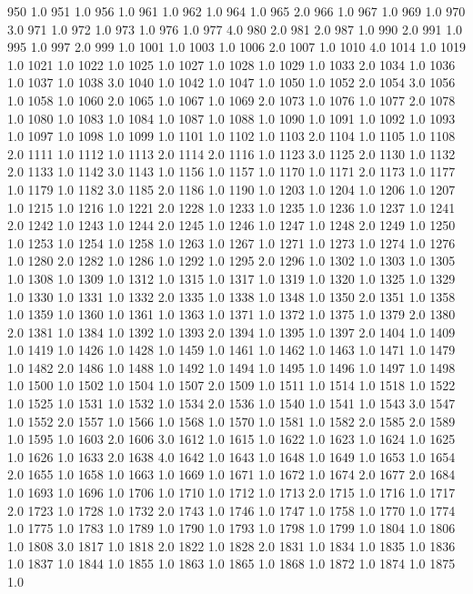 950	1.0
951	1.0
956	1.0
961	1.0
962	1.0
964	1.0
965	2.0
966	1.0
967	1.0
969	1.0
970	3.0
971	1.0
972	1.0
973	1.0
976	1.0
977	4.0
980	2.0
981	2.0
987	1.0
990	2.0
991	1.0
995	1.0
997	2.0
999	1.0
1001	1.0
1003	1.0
1006	2.0
1007	1.0
1010	4.0
1014	1.0
1019	1.0
1021	1.0
1022	1.0
1025	1.0
1027	1.0
1028	1.0
1029	1.0
1033	2.0
1034	1.0
1036	1.0
1037	1.0
1038	3.0
1040	1.0
1042	1.0
1047	1.0
1050	1.0
1052	2.0
1054	3.0
1056	1.0
1058	1.0
1060	2.0
1065	1.0
1067	1.0
1069	2.0
1073	1.0
1076	1.0
1077	2.0
1078	1.0
1080	1.0
1083	1.0
1084	1.0
1087	1.0
1088	1.0
1090	1.0
1091	1.0
1092	1.0
1093	1.0
1097	1.0
1098	1.0
1099	1.0
1101	1.0
1102	1.0
1103	2.0
1104	1.0
1105	1.0
1108	2.0
1111	1.0
1112	1.0
1113	2.0
1114	2.0
1116	1.0
1123	3.0
1125	2.0
1130	1.0
1132	2.0
1133	1.0
1142	3.0
1143	1.0
1156	1.0
1157	1.0
1170	1.0
1171	2.0
1173	1.0
1177	1.0
1179	1.0
1182	3.0
1185	2.0
1186	1.0
1190	1.0
1203	1.0
1204	1.0
1206	1.0
1207	1.0
1215	1.0
1216	1.0
1221	2.0
1228	1.0
1233	1.0
1235	1.0
1236	1.0
1237	1.0
1241	2.0
1242	1.0
1243	1.0
1244	2.0
1245	1.0
1246	1.0
1247	1.0
1248	2.0
1249	1.0
1250	1.0
1253	1.0
1254	1.0
1258	1.0
1263	1.0
1267	1.0
1271	1.0
1273	1.0
1274	1.0
1276	1.0
1280	2.0
1282	1.0
1286	1.0
1292	1.0
1295	2.0
1296	1.0
1302	1.0
1303	1.0
1305	1.0
1308	1.0
1309	1.0
1312	1.0
1315	1.0
1317	1.0
1319	1.0
1320	1.0
1325	1.0
1329	1.0
1330	1.0
1331	1.0
1332	2.0
1335	1.0
1338	1.0
1348	1.0
1350	2.0
1351	1.0
1358	1.0
1359	1.0
1360	1.0
1361	1.0
1363	1.0
1371	1.0
1372	1.0
1375	1.0
1379	2.0
1380	2.0
1381	1.0
1384	1.0
1392	1.0
1393	2.0
1394	1.0
1395	1.0
1397	2.0
1404	1.0
1409	1.0
1419	1.0
1426	1.0
1428	1.0
1459	1.0
1461	1.0
1462	1.0
1463	1.0
1471	1.0
1479	1.0
1482	2.0
1486	1.0
1488	1.0
1492	1.0
1494	1.0
1495	1.0
1496	1.0
1497	1.0
1498	1.0
1500	1.0
1502	1.0
1504	1.0
1507	2.0
1509	1.0
1511	1.0
1514	1.0
1518	1.0
1522	1.0
1525	1.0
1531	1.0
1532	1.0
1534	2.0
1536	1.0
1540	1.0
1541	1.0
1543	3.0
1547	1.0
1552	2.0
1557	1.0
1566	1.0
1568	1.0
1570	1.0
1581	1.0
1582	2.0
1585	2.0
1589	1.0
1595	1.0
1603	2.0
1606	3.0
1612	1.0
1615	1.0
1622	1.0
1623	1.0
1624	1.0
1625	1.0
1626	1.0
1633	2.0
1638	4.0
1642	1.0
1643	1.0
1648	1.0
1649	1.0
1653	1.0
1654	2.0
1655	1.0
1658	1.0
1663	1.0
1669	1.0
1671	1.0
1672	1.0
1674	2.0
1677	2.0
1684	1.0
1693	1.0
1696	1.0
1706	1.0
1710	1.0
1712	1.0
1713	2.0
1715	1.0
1716	1.0
1717	2.0
1723	1.0
1728	1.0
1732	2.0
1743	1.0
1746	1.0
1747	1.0
1758	1.0
1770	1.0
1774	1.0
1775	1.0
1783	1.0
1789	1.0
1790	1.0
1793	1.0
1798	1.0
1799	1.0
1804	1.0
1806	1.0
1808	3.0
1817	1.0
1818	2.0
1822	1.0
1828	2.0
1831	1.0
1834	1.0
1835	1.0
1836	1.0
1837	1.0
1844	1.0
1855	1.0
1863	1.0
1865	1.0
1868	1.0
1872	1.0
1874	1.0
1875	1.0
